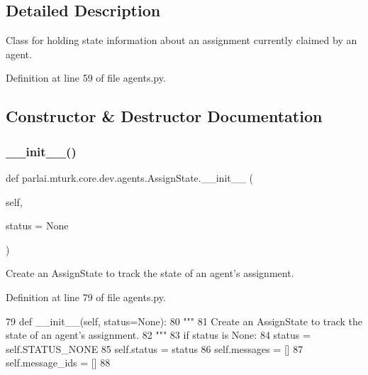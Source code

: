 \subsection{Detailed Description}
\begin{DoxyVerb}Class for holding state information about an assignment currently claimed by an
agent.
\end{DoxyVerb}
 

Definition at line 59 of file agents.\+py.



\subsection{Constructor \& Destructor Documentation}
\mbox{\label{classparlai_1_1mturk_1_1core_1_1dev_1_1agents_1_1AssignState_a9976e9b61eb5425255601bc99a10fdc7}} 
\subsubsection{\texorpdfstring{\+\_\+\+\_\+init\+\_\+\+\_\+()}{\_\_init\_\_()}}
{\footnotesize\ttfamily def parlai.\+mturk.\+core.\+dev.\+agents.\+Assign\+State.\+\_\+\+\_\+init\+\_\+\+\_\+ (\begin{DoxyParamCaption}\item[{}]{self,  }\item[{}]{status = {\ttfamily None} }\end{DoxyParamCaption})}

\begin{DoxyVerb}Create an AssignState to track the state of an agent's assignment.
\end{DoxyVerb}
 

Definition at line 79 of file agents.\+py.


\begin{DoxyCode}
79     \textcolor{keyword}{def }\_\_init\_\_(self, status=None):
80         \textcolor{stringliteral}{"""}
81 \textcolor{stringliteral}{        Create an AssignState to track the state of an agent's assignment.}
82 \textcolor{stringliteral}{        """}
83         \textcolor{keywordflow}{if} status \textcolor{keywordflow}{is} \textcolor{keywordtype}{None}:
84             status = self.STATUS\_NONE
85         self.status = status
86         self.messages = []
87         self.message\_ids = []
88 
\end{DoxyCode}


